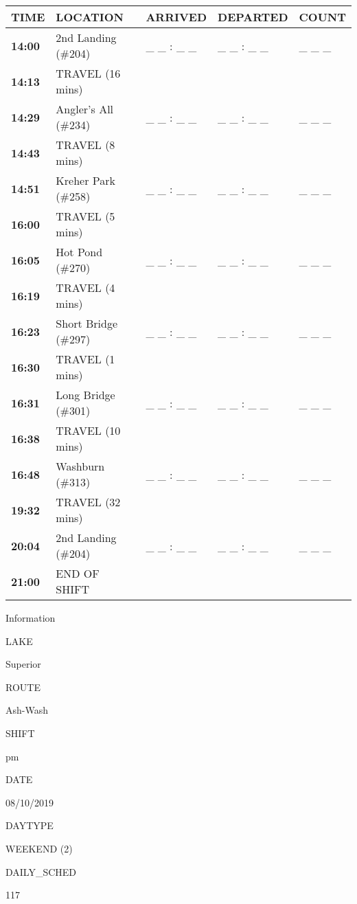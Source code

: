 \documentclass[]{article}
\begin{document}
\begin{tabular}{>{\bfseries}lllll}
\toprule
\textbf{TIME} & \textbf{LOCATION} & \textbf{ARRIVED} & \textbf{DEPARTED} & \textbf{COUNT}\\
\midrule
14:00 & 2nd Landing (\#204) & \_ \_ : \_ \_ & \_ \_ : \_ \_ & \_ \_ \_\\
14:13 & TRAVEL (16 mins) &  &  & \\
14:29 & Angler's All (\#234) & \_ \_ : \_ \_ & \_ \_ : \_ \_ & \_ \_ \_\\
14:43 & TRAVEL (8 mins) &  &  & \\
14:51 & Kreher Park (\#258) & \_ \_ : \_ \_ & \_ \_ : \_ \_ & \_ \_ \_\\
16:00 & TRAVEL (5 mins) &  &  & \\
16:05 & Hot Pond (\#270) & \_ \_ : \_ \_ & \_ \_ : \_ \_ & \_ \_ \_\\
16:19 & TRAVEL (4 mins) &  &  & \\
16:23 & Short Bridge (\#297) & \_ \_ : \_ \_ & \_ \_ : \_ \_ & \_ \_ \_\\
16:30 & TRAVEL (1 mins) &  &  & \\
16:31 & Long Bridge (\#301) & \_ \_ : \_ \_ & \_ \_ : \_ \_ & \_ \_ \_\\
16:38 & TRAVEL (10 mins) &  &  & \\
16:48 & Washburn (\#313) & \_ \_ : \_ \_ & \_ \_ : \_ \_ & \_ \_ \_\\
19:32 & TRAVEL (32 mins) &  &  & \\
20:04 & 2nd Landing (\#204) & \_ \_ : \_ \_ & \_ \_ : \_ \_ & \_ \_ \_\\
21:00 & END OF SHIFT &  &  & \\
\bottomrule
\end{tabular}\newpage

Information

LAKE

Superior

ROUTE

Ash-Wash

SHIFT

pm

DATE

08/10/2019

DAYTYPE

WEEKEND (2)

DAILY\_SCHED

117

\vspace{24pt}
\end{document}
